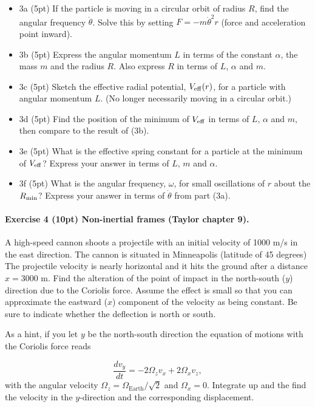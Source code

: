 \documentclass[%
oneside,                 %
final,                   %
10pt]{article}
\begin{document}
\begin{itemize}
\item 3a (5pt)  If the particle is moving in a circular orbit of radius $R$, find the angular frequency $\dot{\theta}$. Solve this by setting $F=-m\dot{\theta}^2r$ (force and acceleration point inward).

\item 3b (5pt) Express the angular momentum $L$ in terms of the constant $\alpha$, the mass $m$ and the radius $R$. Also express $R$ in terms of $L$, $\alpha$ and $m$.

\item 3c (5pt) Sketch the effective radial potential, $V_{\rm eff}(r)$, for a particle with angular momentum $L$. (No longer necessarily moving in a circular orbit.)

\item 3d (5pt)  Find the position of the minimum of $V_{\rm eff}$ in terms of $L$, $\alpha$ and $m$, then compare to the result of (3b).

\item 3e (5pt)  What is the effective spring constant for a particle at the minimum of $V_{\rm eff}$? Express your answer in terms of $L$, $m$ and $\alpha$. 

\item 3f (5pt)  What is the angular frequency, $\omega$, for small oscillations of $r$ about the $R_{\rm min}$?  Express your answer in terms of $\dot{\theta}$ from part (3a).
\end{itemize}

\noindent
\paragraph{Exercise 4 (10pt) Non-inertial frames (Taylor chapter 9).}
A high-speed cannon shoots a projectile with an initial velocity of
1000 m/s in the east direction. The cannon is situated in
Minneapolis (latitude of 45 degrees) The projectile velocity is
nearly horizontal and it hits the ground after a distance $x=3000$
  m. Find the alteration of the point of impact in the north-south
  ($y$) direction due to the Coriolis force. Assume the effect is
  small so that you can approximate the eastward ($x$) component of
  the velocity as being constant. Be sure to indicate whether the
  deflection is north or south.

As a hint, if you let $y$ be the north-south direction the equation of motions with the Coriolis force reads

\[
\frac{dv_y}{dt}= -2\Omega_zv_x + 2\Omega_xv_z,
\]
with the angular velocity $\Omega_z=\Omega_{\mathrm{Earth}}/\sqrt{2}$ and $\Omega_x=0$.
Integrate up and the find the velocity in the $y$-direction and the corresponding displacement. 
\end{document}
